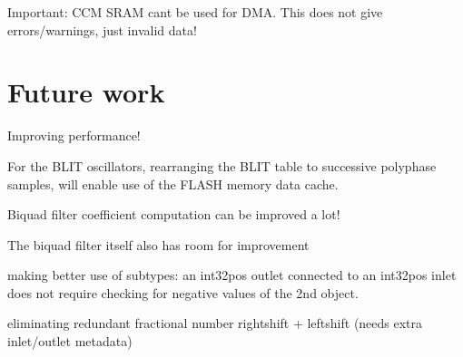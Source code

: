 Important\+: C\+CM S\+R\+AM can\textquotesingle{}t be used for D\+MA. This does not give errors/warnings, just invalid data!\hypertarget{developers_developers_performance}{}\section{Future work}\label{developers_developers_performance}
Improving performance! 
\begin{DoxyItemize}
\item For the B\+L\+IT oscillators, rearranging the B\+L\+IT table to successive polyphase samples, will enable use of the F\+L\+A\+SH memory data cache. 
\item Biquad filter coefficient computation can be improved a lot! 
\item The biquad filter itself also has room for improvement 
\item making better use of subtypes\+: an int32pos outlet connected to an int32pos inlet does not require checking for negative values of the 2nd object. 
\item eliminating redundant fractional number rightshift + leftshift (needs extra inlet/outlet metadata) 
\end{DoxyItemize}